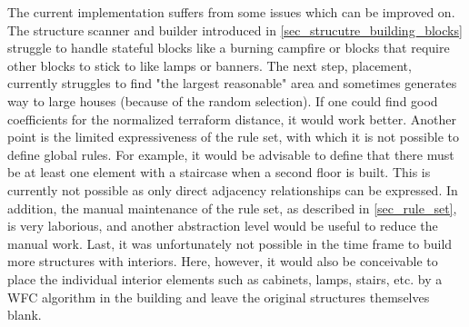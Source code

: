 \documentclass[
oneside,
fontsize=11pt
]{scrartcl}
\begin{document}
The current implementation suffers from some issues which can be improved on.
The structure scanner and builder introduced in \autoref{sec_strucutre_building_blocks} 
struggle to handle stateful blocks like a burning campfire 
or blocks that require other blocks to stick to like lamps or banners.
The next step, placement, currently struggles to find "the largest reasonable" area 
and sometimes generates way to large houses (because of the random selection).
If one could find good coefficients for the normalized terraform distance, it would work better.
Another point is the limited expressiveness of the rule set, with which it is not possible to define global rules. 
For example, it would be advisable to define that there must be at least one element with a staircase when a second floor is built.
This is currently not possible as only direct adjacency relationships can be expressed.
In addition, the manual maintenance of the rule set, as described in \autoref{sec_rule_set}, 
is very laborious, and another abstraction level would be useful to reduce the manual work. 
Last, it was unfortunately not possible in the time frame to build more structures with interiors. 
Here, however, it would also be conceivable to place the individual interior elements 
such as cabinets, lamps, stairs, etc. by a WFC algorithm in the building and leave the original structures themselves blank. 








\newpage
\appendix  %




\end{document}
